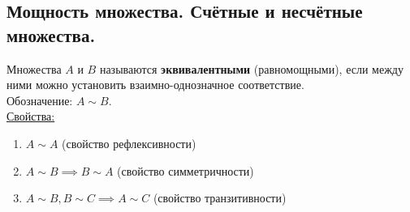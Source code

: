 \documentclass[12pt]{article}
\begin{document}
    \subsection{Мощность множества. Счётные и несчётные множества.}
    \noindent Множества $A$ и $B$ называются \textbf{эквивалентными} (равномощными), если между ними можно установить взаимно-однозначное соответствие.\\
    Обозначение: $A \sim B$.\\
    \underline{Свойства:}
    \begin{enumerate}
        \item $A \sim A$ (свойство рефлексивности)
        \item $A \sim B \implies B \sim A$ (свойство симметричности)
        \item $A \sim B, B \sim C \implies A \sim C$ (свойство транзитивности)
    \end{enumerate}
\end{document}
